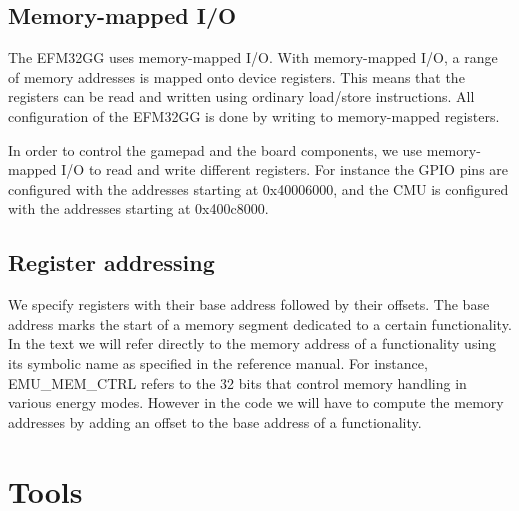 \subsection{Memory-mapped I/O}
The EFM32GG uses memory-mapped I/O. With memory-mapped I/O, a range of memory addresses is mapped onto device registers. This means that the registers can be read and written using ordinary load/store instructions. All configuration of the EFM32GG is done by writing to memory-mapped registers.\cite{EFM32GG-RM}

In order to control the gamepad and the board components, we use memory-mapped I/O to read and write different registers. For instance the GPIO pins are configured with the addresses starting at 0x40006000, and the CMU is configured with the addresses starting at 0x400c8000.


\subsection{Register addressing}
We specify registers with their base address followed by their offsets. The base address marks the start of a memory segment dedicated to a certain functionality. In the text we will refer directly to the memory address of a functionality using its symbolic name as specified in the reference manual. For instance, EMU\_MEM\_CTRL refers to the 32 bits that control memory handling in various energy modes. However in the code we will have to compute the memory addresses by adding an offset to the base address of a functionality.



\section{Tools}

